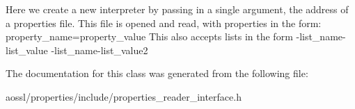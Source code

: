 Here we create a new interpreter by passing in a single argument, the address of a properties file. This file is opened and read, with properties in the form\+: property\+\_\+name=property\+\_\+value This also accepts lists in the form -\/list\+\_\+name-\/list\+\_\+value -\/list\+\_\+name-\/list\+\_\+value2 

The documentation for this class was generated from the following file\+:\begin{DoxyCompactItemize}
\item 
aossl/properties/include/properties\+\_\+reader\+\_\+interface.\+h\end{DoxyCompactItemize}
